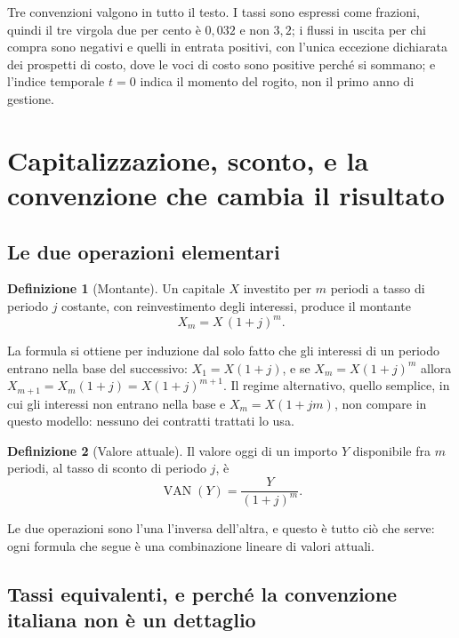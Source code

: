 \documentclass[11pt,a4paper]{article}
\theoremstyle{definition}
\newtheorem{definizione}{Definizione}[section]
\theoremstyle{plain}
\DeclareMathOperator{\VAN}{VAN}
\begin{document}
Tre convenzioni valgono in tutto il testo. I tassi sono espressi come frazioni, quindi il tre virgola due per cento è $0{,}032$ e non $3{,}2$; i flussi in uscita per chi compra sono negativi e quelli in entrata positivi, con l'unica eccezione dichiarata dei prospetti di costo, dove le voci di costo sono positive perché si sommano; e l'indice temporale $t=0$ indica il momento del rogito, non il primo anno di gestione.

\section{Capitalizzazione, sconto, e la convenzione che cambia il risultato}

\subsection{Le due operazioni elementari}

\begin{definizione}[Montante]
Un capitale $X$ investito per $m$ periodi a tasso di periodo $j$ costante, con reinvestimento degli interessi, produce il montante
\begin{equation}
X_m = X\,(1+j)^m .
\end{equation}
\end{definizione}

La formula si ottiene per induzione dal solo fatto che gli interessi di un periodo entrano nella base del successivo: $X_1 = X(1+j)$, e se $X_m = X(1+j)^m$ allora $X_{m+1} = X_m(1+j) = X(1+j)^{m+1}$. Il regime alternativo, quello semplice, in cui gli interessi non entrano nella base e $X_m = X(1+jm)$, non compare in questo modello: nessuno dei contratti trattati lo usa.

\begin{definizione}[Valore attuale]
Il valore oggi di un importo $Y$ disponibile fra $m$ periodi, al tasso di sconto di periodo $j$, è
\begin{equation}
\VAN(Y) = \frac{Y}{(1+j)^m} .
\end{equation}
\end{definizione}

Le due operazioni sono l'una l'inversa dell'altra, e questo è tutto ciò che serve: ogni formula che segue è una combinazione lineare di valori attuali.

\subsection{Tassi equivalenti, e perché la convenzione italiana non è un dettaglio}
\end{document}
